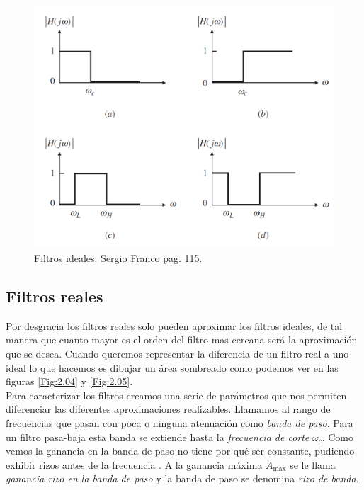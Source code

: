 \documentclass[12pt,a4paper]{article}
\numberwithin{equation}{section}
\numberwithin{figure}{section}
\begin{document}
\begin{figure}[h!] \centering
\includegraphics[scale=0.7]{2.2-Ideales.png}
\caption{Filtros ideales. Sergio Franco pag. 115.}
\label{Fig:2.03}
\end{figure}

\subsection{Filtros reales}

Por desgracia los filtros reales solo pueden aproximar los filtros ideales, de tal manera que cuanto mayor es el orden del filtro mas cercana será la aproximación que se desea. Cuando queremos representar la diferencia de un filtro real a uno ideal lo que hacemos es dibujar un área sombreado como podemos ver en las figuras \ref{Fig:2.04} y \ref{Fig:2.05}. \\ 

Para caracterizar los filtros creamos una serie de parámetros que nos permiten diferenciar las diferentes aproximaciones realizables. Llamamos al rango de frecuencias que pasan con poca o ninguna atenuación como \textit{banda de paso}. Para un filtro pasa-baja esta banda se extiende hasta la \textit{frecuencia de corte} $\omega_c$. Como vemos la ganancia en la banda de paso no tiene por qué ser constante, pudiendo exhibir rizos antes de la frecuencia . A la ganancia máxima $A_{\max}$ se le llama \textit{ganancia rizo en la banda de paso} y la banda de paso se denomina \textit{rizo de banda}. \\
\end{document}
